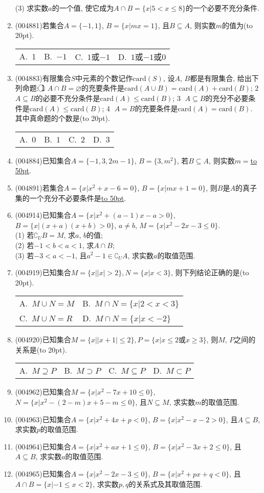 \documentclass[10pt,a4paper]{article}
\newcommand{\blank}[1]{\underline{\hbox to #1pt{}}}
\newcommand{\bracket}[1]{(\hbox to #1pt{})}
\newcommand{\twoch}[4]{\par\begin{tabular}{p{.46\textwidth}p{.46\textwidth}}
A.~#1& B.~#2\\
C.~#3& D.~#4
\end{tabular}}
\newcommand{\fourch}[4]{\par\begin{tabular}{p{.23\textwidth}p{.23\textwidth}p{.23\textwidth}p{.23\textwidth}}
A.~#1 &B.~#2& C.~#3& D.~#4
\end{tabular}}
\begin{document}
\begin{enumerate}[1.]
(3) 求实数$a$的一个值, 使它成为$A\cap B=\{x|5<x\le 8\}$的一个必要不充分条件.
\item {\tiny (004881)}若集合$A=\{-1,1\}$, $B=\{x|mx=1\}$, 且$B\subseteq A$, 则实数$m$的值为\bracket{20}.
\fourch{$1$}{$-1$}{$1$或$-1$}{$1$或$-1$或$0$}
\item {\tiny (004883)}有限集合$S$中元素的个数记作$\mathrm{card}(S)$, 设$A$, $B$都是有限集合, 给出下列命题:
\textcircled{1} $A\cap B=\varnothing$的充要条件是$\mathrm{card}(A\cup B)=\mathrm{card}(A)+\mathrm{card}(B)$; \textcircled{2} $A\subseteq B$的必要不充分条件是$\mathrm{card}(A)\le \mathrm{card}(B)$; \textcircled{3} $A\subseteq B$的充分不必要条件是$\mathrm{card}(A)\le \mathrm{card}(B)$; \textcircled{4} $A=B$的充要条件是$\mathrm{card}(A)=\mathrm{card}(B)$. 
其中真命题的个数是\bracket{20}.
\fourch{$0$}{$1$}{$2$}{$3$}
\item {\tiny (004884)}已知集合$A=\{-1,3,2m-1\}$, $B=\{3,m^2\}$, 若$B\subseteq A$, 则实数$m=$\blank{50}.
\item {\tiny (004891)}若集合$A=\{x|x^2+x-6=0\}$, $B=\{x|mx+1=0\}$, 则$B$是$A$的真子集的一个充分不必要条件是\blank{50}.
\item {\tiny (004914)}已知集合$A=\{x|x^2+(a-1)x-a>0\}$, $B=\{x|(x+a)(x+b)>0\}$, $a\ne b$, $M=\{x|x^2-2x-3\le 0\}$.\\
(1) 若$\complement_UB=M$, 求$a$, $b$的值;\\
(2) 若$-1<b<a<1$, 求$A\cap B$;\\
(3) 若$-3<a<-1$, 且$a^2-1\in \complement_UA$, 求实数$a$的取值范围.
\item {\tiny (004919)}已知集合$M=\{x||x|>2\},N=\{x|x<3\}$, 则下列结论正确的是\bracket{20}.
\twoch{$M\cup N=M$}{$M\cap N=\{x|2<x<3\}$}{$M\cup N=R$}{$M\cap N=\{x|x<-2\}$}
\item {\tiny (004920)}已知集合$M=\{x||x+1|\le 2\},P=\{x|x\le 2$或$x\ge 3\}$, 则$M$, $P$之间的关系是\bracket{20}.
\fourch{$M\supseteq P$}{$M\supset P$}{$M\subseteq P$}{$M\subset P$}
\item {\tiny (004962)}已知集合$M=\{x|x^2-7x+10\le 0\}$, $N=\{x|x^2-(2-m)x+5-m\le 0\}$, 且$N\subseteq M$, 求实数$m$的取值范围.
\item {\tiny (004963)}已知集合$A=\{x|x^2+4x+p<0\}$, $B=\{x|x^2-x-2>0\}$, 且$A\subseteq B$, 求实数$p$的取值范围.
\item {\tiny (004964)}已知集合$A=\{x|x^2+ax+1\le 0\}$, $B=\{x|x^2-3x+2\le 0\}$, 且$A\subseteq B$, 求实数$a$的取值范围.
\item {\tiny (004965)}已知集合$A=\{x|x^2-2x-3\le 0\}$, $B=\{x|x^2+px+q<0\}$, 且$A\cap B=\{x|-1\le x<2\}$, 求实数$p,q$的关系式及其取值范围.

\end{enumerate}
\end{document}
